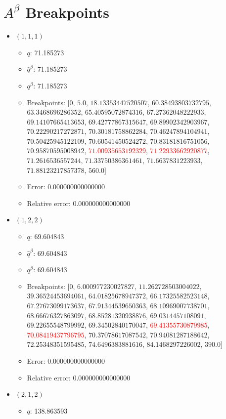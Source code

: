 \documentclass{article}%
\begin{document}
\section{$A^\beta$ Breakpoints}%
\thispagestyle{plain}%
\begin{itemize}%
	\item $(1, 1, 1)$%
	\begin{itemize}%
		\item $q$: 71.185273%
		\item $\hat{q}^\beta$: 71.185273%
		\item $q^\beta$: 71.185273%
		\item Breakpoints: $[$$0$, $5.0$, $18.13353447520507$, $60.38493803732795$, $63.3468696286352$, $65.40595072874316$, $67.27362048222933$, $69.14107665413653$, $69.42777867315647$, $69.89902342903967$, $70.22290217272871$, $70.30181758862284$, $70.46247894104941$, $70.50425945122109$, $70.60541450524272$, $70.83181816751056$, $70.95870595008942$, \textcolor{red}{$71.00935653192329$}, \textcolor{red}{$71.22933662920877$}, $71.2616536557244$, $71.33750386361461$, $71.6637831223933$, $71.88123217857378$, $560.0$$]$%
		\item Error: 0.000000000000000%
		\item Relative error: 0.000000000000000%
	\end{itemize}%
	\item $(1, 2, 2)$%
	\begin{itemize}%
		\item $q$: 69.604843%
		\item $\hat{q}^\beta$: 69.604843%
		\item $q^\beta$: 69.604843%
		\item Breakpoints: $[$$0$, $6.000977230027827$, $11.262728503004022$, $39.36524453694061$, $64.01825678947372$, $66.17325582523148$, $67.27673099173637$, $67.91344539650363$, $68.10969007738701$, $68.66676327863097$, $68.85281320938876$, $69.0314457108091$, $69.22655548799992$, $69.34502840170047$, \textcolor{red}{$69.41355730879985$}, \textcolor{red}{$70.08419437796795$}, $70.37078617087542$, $70.94081287188642$, $72.25348351595485$, $74.6496383881616$, $84.1468297226002$, $390.0$$]$%
		\item Error: 0.000000000000000%
		\item Relative error: 0.000000000000000%
	\end{itemize}%
	\item $(2, 1, 2)$%
	\begin{itemize}%
		\item $q$: 138.863593%

\end{itemize}
\end{itemize}
\end{document}
